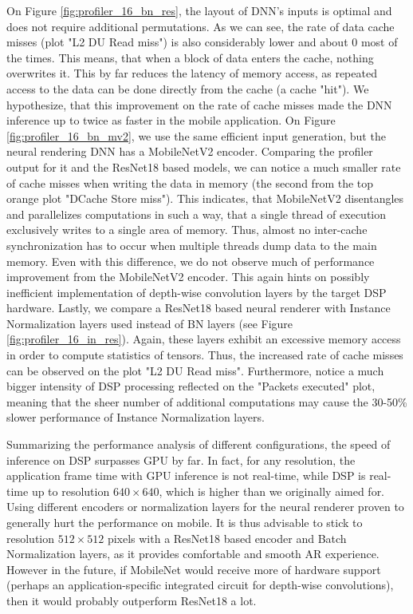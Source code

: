 On Figure \ref{fig:profiler_16_bn_res}, the layout of DNN's inputs is optimal and does not require additional permutations. As we can see, the rate of data cache misses (plot "L2 DU Read miss") is also considerably lower and about 0 most of the times. This means, that when a block of data enters the cache, nothing overwrites it. This by far reduces the latency of memory access, as repeated access to the data can be done directly from the cache (a cache "hit"). We hypothesize, that this improvement on the rate of cache misses made the DNN inference up to twice as faster in the mobile application. On Figure \ref{fig:profiler_16_bn_mv2}, we use the same efficient input generation, but the neural rendering DNN has a MobileNetV2 encoder. Comparing the profiler output for it and the ResNet18 based models, we can notice a much smaller rate of cache misses when writing the data in memory (the second from the top orange plot "DCache Store miss"). This indicates, that MobileNetV2 disentangles and parallelizes computations in such a way, that a single thread of execution exclusively writes to a single area of memory. Thus, almost no inter-cache synchronization has to occur when multiple threads dump data to the main memory. Even with this difference, we do not observe much of performance improvement from the MobileNetV2 encoder. This again hints on possibly inefficient implementation of depth-wise convolution layers by the target DSP hardware. Lastly, we compare a ResNet18 based neural renderer with Instance Normalization layers used instead of BN layers (see Figure \ref{fig:profiler_16_in_res}). Again, these layers exhibit an excessive memory access in order to compute statistics of tensors. Thus, the increased rate of cache misses can be observed on the plot "L2 DU Read miss". Furthermore, notice a much bigger intensity of DSP processing reflected on the "Packets executed" plot, meaning that the sheer number of additional computations may cause the 30-50\% slower performance of Instance Normalization layers.

Summarizing the performance analysis of different configurations, the speed of inference on DSP surpasses GPU by far. In fact, for any resolution, the application frame time with GPU inference is not real-time, while DSP is real-time up to resolution $640 \times 640$, which is higher than we originally aimed for. Using different encoders or normalization layers for the neural renderer proven to generally hurt the performance on mobile. It is thus advisable to stick to resolution $512 \times 512$ pixels with a ResNet18 based encoder and Batch Normalization layers, as it provides comfortable and smooth AR experience. However in the future, if MobileNet would receive more of hardware support (perhaps an application-specific integrated circuit for depth-wise convolutions), then it would probably outperform ResNet18 a lot.

